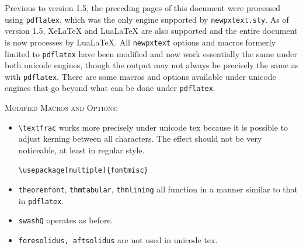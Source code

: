 \documentclass[11pt]{article}
\theoremstyle{oldplain}
\theoremstyle{plain}
\begin{document}
Previous to version 1.5, the preceding pages of this document were processed using {\tt pdflatex}, which was the only engine supported by {\tt newpxtext.sty}. As of version 1.5, XeLaTeX and LuaLaTeX are also supported and the entire document is now processes by LuaLaTeX. All {\tt newpxtext} options and macros formerly limited to {\tt pdflatex} have been modified and now work essentially the same under both unicode engines, though the output may not always be precisely the same as with {\tt pdflatex}. There are some macros and options available under unicode engines that go beyond what can be done under {\tt pdflatex}.

\textsc{Modified Macros and Options:}
\begin{itemize}
\item
\verb|\textfrac| works more precisely under unicode tex because it is possible to adjust kerning between all characters. The effect should not be very noticeable, at least in regular style. 
\begin{verbatim}
\usepackage[multiple]{fontmisc}
\end{verbatim}
\item {\tt theoremfont}, {\tt thmtabular}, {\tt thmlining} all function in a manner similar to that in {\tt pdflatex}.
\item {\tt swashQ} operates as before.
\item {\tt foresolidus, aftsolidus} are not used in unicode tex.

\end{itemize}
\end{document}
